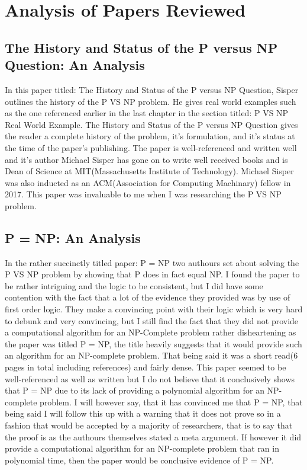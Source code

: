 \documentclass{report}
\begin{document}
\section{Analysis of Papers Reviewed}
\subsection{The History and Status of the P versus NP Question: An Analysis}
In this paper titled: The History and Status of the P versus NP Question\cite{HistoryOfPVsNP}, Sisper outlines the history of the P VS NP problem.  He gives real world examples such as the one referenced earlier in the last chapter in the section titled: P VS NP Real World Example.  The History and Status of the P versus NP Question gives the reader a complete history of the problem, it's formulation, and it's status at the time of the paper's publishing.  The paper is well-referenced and written well and it's author Michael Sisper has gone on to write well received books\cite{Sisperbib} and is Dean of Science at MIT(Massachusetts Institute of Technology)\cite{Sisperdean}.  Michael Sisper was also inducted as an ACM(Association for Computing Machinary) fellow in 2017\cite{Sisperacm}. This paper was invaluable to me when I was researching the P VS NP problem.
\subsection{P = NP: An Analysis}
In the rather succinctly titled paper: P = NP\cite{PVsNPSolved} two authours set about solving the P VS NP problem by showing that P does in fact equal NP.  I found the paper to be rather intriguing and the logic to be consistent, but I did have some contention with the fact that a lot of the evidence they provided was by use of first order logic.  They make a convincing point with their logic which is very hard to debunk and very convincing, but I still find the fact that they did not provide a computational algorithm for an NP-Complete problem rather disheartening as the paper was titled P = NP, the title heavily suggests that it would provide such an algorithm for an NP-complete problem.  That being said it was a short read(6 pages in total including references) and fairly dense.  This paper seemed to be well-referenced as well as written but I do not believe that it conclusively shows that P = NP due to its lack of providing a polynomial algorithm for an NP-complete problem.  I will however say, that it has convinced me that P = NP, that being said I will follow this up with a warning that it does not prove so in a fashion that would be accepted by a majority of researchers, that is to say that the proof is as the authours themselves stated a meta argument.  If however it did provide a computational algorithm for an NP-complete problem that ran in polynomial time, then the paper would be conclusive evidence of P = NP.
\end{document}
